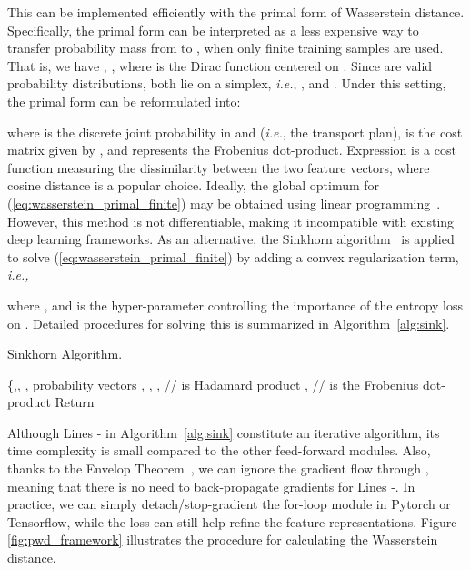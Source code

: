 \documentclass[final]{cvpr}
\theoremstyle{definition}
\begin{document}
This can be implemented efficiently with the primal form of Wasserstein distance. Specifically, the primal form can be interpreted as a less expensive way to transfer probability mass from  to , when only finite training samples are used. That is, we have , , where  is the Dirac function centered on . Since  are valid probability distributions,  both lie on a simplex, \emph{i.e.}, , and . 
Under this setting, 
the primal form can be reformulated into:

where  is the discrete joint probability in  and  (\emph{i.e.}, the transport plan),  is the cost matrix given by , and  represents the Frobenius dot-product. Expression  is a cost function measuring the dissimilarity between the two feature vectors, where cosine distance  is a popular choice.
Ideally, the global optimum for (\ref{eq:wasserstein_primal_finite}) may be obtained using linear programming~\cite{villani2008optimal, peyre2017computational}. However, this method is not differentiable, making it incompatible with existing deep learning frameworks. 
As an alternative, the Sinkhorn algorithm~\cite{cuturi2013sinkhorn} is applied to solve (\ref{eq:wasserstein_primal_finite}) by adding a convex regularization term, \emph{i.e.,}

where , and  is the hyper-parameter controlling the importance of the entropy loss on . 
Detailed procedures for solving this is summarized in Algorithm~\ref{alg:sink}.
\begin{algorithm}[!t]
\caption{Sinkhorn Algorithm.}
\label{alg:sink}
\begin{algorithmic}[1]
 \footnotesize{ \{,, , probability vectors , }
\STATE , 
\STATE , 
\FOR{}
    \STATE  \footnotesize{//  is Hadamard product}
    \FOR{}
        \STATE , 
    \ENDFOR
    \STATE 
\ENDFOR
\STATE   // \footnotesize{ is the Frobenius dot-product} 
\STATE Return 


\end{algorithmic}
\end{algorithm} Although Lines - in Algorithm~\ref{alg:sink} constitute an iterative algorithm, its time complexity is small compared to the other feed-forward modules. Also, thanks to the Envelop Theorem~\cite{carter2001foundations}, we can ignore the gradient flow through , meaning that there is no need to back-propagate gradients for Lines -. In practice, we can simply detach/stop-gradient the for-loop module in Pytorch or Tensorflow, while the loss can still help refine the feature representations. 
Figure \ref{fig:pwd_framework} illustrates the procedure for calculating the Wasserstein distance.
\end{document}
